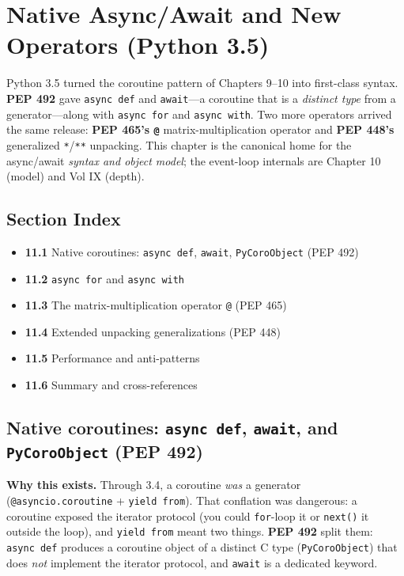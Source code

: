 \chapter{Native Async/Await and New Operators (Python 3.5)}

Python 3.5 turned the coroutine pattern of Chapters 9--10 into first-class syntax. \textbf{PEP 492}
gave \texttt{async def} and \texttt{await}---a coroutine that is a \emph{distinct type} from a
generator---along with \texttt{async for} and \texttt{async with}. Two more operators arrived the
same release: \textbf{PEP 465's \texttt{@}} matrix-multiplication operator and \textbf{PEP 448's}
generalized \texttt{*}/\texttt{**} unpacking. This chapter is the canonical home for the
async/await \emph{syntax and object model}; the event-loop internals are Chapter 10 (model) and
Vol IX (depth).

\section*{Section Index}
\begin{itemize}
  \item \textbf{11.1} Native coroutines: \texttt{async def}, \texttt{await}, \texttt{PyCoroObject} (PEP 492)
  \item \textbf{11.2} \texttt{async for} and \texttt{async with}
  \item \textbf{11.3} The matrix-multiplication operator \texttt{@} (PEP 465)
  \item \textbf{11.4} Extended unpacking generalizations (PEP 448)
  \item \textbf{11.5} Performance and anti-patterns
  \item \textbf{11.6} Summary and cross-references
\end{itemize}

\section{Native coroutines: \texttt{async def}, \texttt{await}, and \texttt{PyCoroObject} (PEP 492)}

\textbf{Why this exists.} Through 3.4, a coroutine \emph{was} a generator
(\texttt{@asyncio.coroutine} + \texttt{yield from}). That conflation was dangerous: a coroutine
exposed the iterator protocol (you could \texttt{for}-loop it or \texttt{next()} it outside the
loop), and \texttt{yield from} meant two things. \textbf{PEP 492} split them: \texttt{async def}
produces a coroutine object of a distinct C type (\texttt{PyCoroObject}) that does \emph{not}
implement the iterator protocol, and \texttt{await} is a dedicated keyword.

